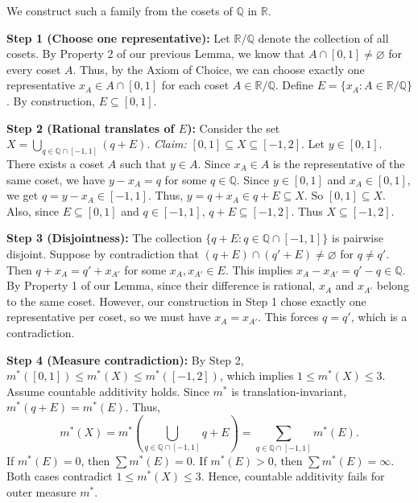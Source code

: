 \begin{pfbox}
    We construct such a family from the cosets of $\mathbb{Q}$ in $\mathbb{R}$.
    
    \textbf{Step 1 (Choose one representative):} Let $\mathbb{R}/\mathbb{Q}$ denote the collection of all cosets. By Property 2 of our previous Lemma, we know that $A \cap [0,1] \neq \varnothing$ for every coset $A$. Thus, by the Axiom of Choice, we can choose exactly one representative $x_A \in A \cap [0,1]$ for each coset $A \in \mathbb{R}/\mathbb{Q}$. 
    Define $E = \{x_A : A \in \mathbb{R}/\mathbb{Q}\}$. By construction, $E \subseteq [0,1]$.
    
    \textbf{Step 2 (Rational translates of $E$):} Consider the set $X = \bigcup_{q \in \mathbb{Q} \cap [-1,1]} (q+E)$.
    \textit{Claim:} $[0,1] \subseteq X \subseteq [-1,2]$.
    Let $y \in [0,1]$. There exists a coset $A$ such that $y \in A$. Since $x_A \in A$ is the representative of the same coset, we have $y - x_A = q$ for some $q \in \mathbb{Q}$. 
    Since $y \in [0,1]$ and $x_A \in [0,1]$, we get $q = y - x_A \in [-1,1]$. 
    Thus, $y = q + x_A \in q+E \subseteq X$. So $[0,1] \subseteq X$.
    Also, since $E \subseteq [0,1]$ and $q \in [-1,1]$, $q+E \subseteq [-1,2]$. Thus $X \subseteq [-1,2]$.
    
    \textbf{Step 3 (Disjointness):} The collection $\{q+E : q \in \mathbb{Q} \cap [-1,1]\}$ is pairwise disjoint.
    Suppose by contradiction that $(q+E) \cap (q'+E) \neq \varnothing$ for $q \neq q'$. Then $q+x_A = q'+x_{A'}$ for some $x_A, x_{A'} \in E$. 
    This implies $x_A - x_{A'} = q' - q \in \mathbb{Q}$. By Property 1 of our Lemma, since their difference is rational, $x_A$ and $x_{A'}$ belong to the same coset. 
    However, our construction in Step 1 chose exactly one representative per coset, so we must have $x_A = x_{A'}$. This forces $q = q'$, which is a contradiction.
    
    \textbf{Step 4 (Measure contradiction):} By Step 2, $m^*([0,1]) \le m^*(X) \le m^*([-1,2])$, which implies $1 \le m^*(X) \le 3$.
    Assume countable additivity holds. Since $m^*$ is translation-invariant, $m^*(q+E) = m^*(E)$. Thus,
    \[ m^*(X) = m^*\left(\bigcup_{q \in \mathbb{Q} \cap [-1,1]} q+E\right) = \sum_{q \in \mathbb{Q} \cap [-1,1]} m^*(E). \]
    If $m^*(E) = 0$, then $\sum m^*(E) = 0$. If $m^*(E) > 0$, then $\sum m^*(E) = \infty$. 
    Both cases contradict $1 \le m^*(X) \le 3$. Hence, countable additivity fails for outer measure $m^*$.
\end{pfbox}



